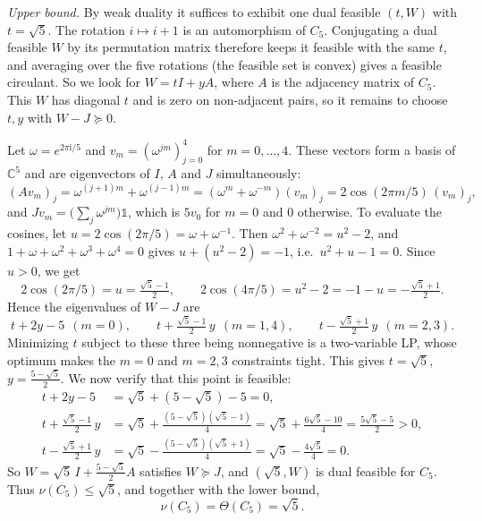 \documentclass[11pt,letterpaper]{article}
\theoremstyle{definition}
\newcommand{\One}{\mathds{1}}
\begin{document}
\emph{Upper bound.} By weak duality it suffices to exhibit one dual feasible $(t,W)$ with $t = \sqrt5$.
The rotation $i\mapsto i+1$ is an automorphism of $C_5$. Conjugating a dual feasible $W$ by its permutation matrix therefore keeps it feasible with the same $t$, and averaging over the five rotations (the feasible set is convex) gives a feasible circulant.
So we look for $W = tI + yA$, where $A$ is the adjacency matrix of $C_5$.
This $W$ has diagonal $t$ and is zero on non-adjacent pairs, so it remains to choose $t,y$ with $W - J\succeq 0$.

Let $\omega = e^{2\pi\mathrm{i}/5}$ and $v_m = (\omega^{jm})_{j=0}^{4}$ for $m = 0,\dots,4$. These vectors form a basis of $\mathbb{C}^5$ and are eigenvectors of $I$, $A$ and $J$ simultaneously:
\[
(Av_m)_j = \omega^{(j+1)m} + \omega^{(j-1)m} = (\omega^m + \omega^{-m})(v_m)_j = 2\cos(2\pi m/5)\,(v_m)_j,
\]
and $Jv_m = \bigl(\sum_{j}\omega^{jm}\bigr)\One$, which is $5v_0$ for $m = 0$ and $0$ otherwise.
To evaluate the cosines, let $u = 2\cos(2\pi/5) = \omega + \omega^{-1}$. Then $\omega^2 + \omega^{-2} = u^2 - 2$, and $1 + \omega + \omega^2 + \omega^3 + \omega^4 = 0$ gives $u + (u^2 - 2) = -1$, i.e.\ $u^2 + u - 1 = 0$. Since $u > 0$, we get
\[
2\cos(2\pi/5) = u = \tfrac{\sqrt5 - 1}{2}, \qquad 2\cos(4\pi/5) = u^2 - 2 = -1 - u = -\tfrac{\sqrt5 + 1}{2}.
\]
Hence the eigenvalues of $W - J$ are
\[
t + 2y - 5 \ \ (m = 0), \qquad t + \tfrac{\sqrt5 - 1}{2}\,y \ \ (m = 1,4), \qquad t - \tfrac{\sqrt5 + 1}{2}\,y \ \ (m = 2,3).
\]
Minimizing $t$ subject to these three being nonnegative is a two-variable LP, whose optimum makes the $m = 0$ and $m = 2,3$ constraints tight.
This gives $t = \sqrt5$, $y = \frac{5 - \sqrt5}{2}$. We now verify that this point is feasible:
\begin{align*}
t + 2y - 5 &= \sqrt5 + (5 - \sqrt5) - 5 = 0,\\
t + \tfrac{\sqrt5 - 1}{2}\,y &= \sqrt5 + \tfrac{(5 - \sqrt5)(\sqrt5 - 1)}{4} = \sqrt5 + \tfrac{6\sqrt5 - 10}{4} = \tfrac{5\sqrt5 - 5}{2} > 0,\\
t - \tfrac{\sqrt5 + 1}{2}\,y &= \sqrt5 - \tfrac{(5 - \sqrt5)(\sqrt5 + 1)}{4} = \sqrt5 - \tfrac{4\sqrt5}{4} = 0.
\end{align*}
So $W = \sqrt5\, I + \frac{5 - \sqrt5}{2}A$ satisfies $W\succeq J$, and $(\sqrt5, W)$ is dual feasible for $C_5$. Thus $\nu(C_5)\leq\sqrt5$, and together with the lower bound,
\[
\nu(C_5) = \Theta(C_5) = \sqrt5.
\]
\end{document}
